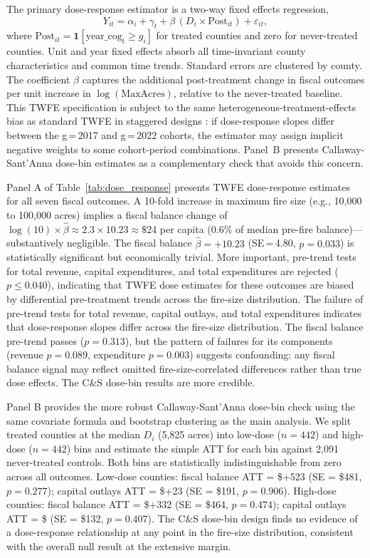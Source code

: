 \documentclass[12pt]{article}
\begin{document}
The primary dose-response estimator is a two-way fixed effects regression,
\begin{equation}
  Y_{it} = \alpha_i + \gamma_t + \beta \, (D_i \times \text{Post}_{it}) + \varepsilon_{it},
  \label{eq:dose_twfe}
\end{equation}
where $\text{Post}_{it} = \mathbf{1}[\text{year\_cog}_t \geq g_i]$ for treated counties
and zero for never-treated counties. Unit and year fixed effects absorb all
time-invariant county characteristics and common time trends. Standard errors are
clustered by county. The coefficient $\beta$ captures the additional post-treatment
change in fiscal outcomes per unit increase in $\log(\text{MaxAcres})$, relative to
the never-treated baseline. This TWFE specification is subject to the same
heterogeneous-treatment-effects bias as standard TWFE in staggered designs
\citep{baker2022}: if dose-response slopes differ between the g\,=\,2017 and
g\,=\,2022 cohorts, the estimator may assign implicit negative weights to some
cohort-period combinations. Panel~B presents Callaway-Sant'Anna dose-bin estimates as a complementary check that
avoids this concern.

Panel A of Table~\ref{tab:dose_response} presents TWFE dose-response estimates for
all seven fiscal outcomes. A 10-fold increase in maximum fire size (e.g., 10,000 to
100,000 acres) implies a fiscal balance change of
$\log(10) \times \hat{\beta} \approx 2.3 \times 10.23 \approx \$24$ per capita
(0.6\% of median pre-fire balance)---substantively negligible. The fiscal balance
$\hat{\beta} = +10.23$ (SE\,=\,4.80, $p = 0.033$) is statistically significant but
economically trivial. More important, pre-trend tests for total revenue, capital
expenditures, and total expenditures are rejected ($p \leq 0.040$), indicating that
TWFE dose estimates for these outcomes are biased by differential pre-treatment
trends across the fire-size distribution. The failure of pre-trend tests for total
revenue, capital outlays, and total expenditures indicates that dose-response slopes
differ across the fire-size distribution. The fiscal balance pre-trend passes
($p = 0.313$), but the pattern of failures for its components (revenue $p = 0.089$,
expenditure $p = 0.003$) suggests confounding: any fiscal balance signal may reflect
omitted fire-size-correlated differences rather than true dose effects. The C\&S
dose-bin results are more credible.

Panel B provides the more robust Callaway-Sant'Anna dose-bin check using the same
covariate formula and bootstrap clustering as the main analysis. We split treated
counties at the median $D_i$ (5,825 acres) into low-dose ($n = 442$) and
high-dose ($n = 442$) bins and estimate the simple ATT for each bin against
2,091 never-treated controls. Both bins are statistically indistinguishable from
zero across all outcomes. Low-dose counties: fiscal balance ATT = \$+523
(SE = \$481, $p = 0.277$); capital outlays ATT = \$+23 (SE = \$191, $p = 0.906$).
High-dose counties: fiscal balance ATT = \$+332 (SE = \$464, $p = 0.474$);
capital outlays ATT = \$ (SE = \$132, $p = 0.407$). The C\&S dose-bin
design finds no evidence of a dose-response relationship at any point in the
fire-size distribution, consistent with the overall null result at the extensive
margin.
\end{document}

